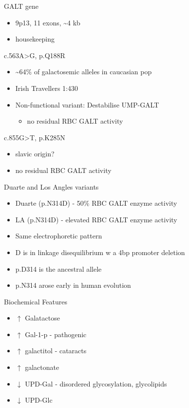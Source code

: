 \documentclass[presentation, smaller]{beamer}
\begin{document}
\begin{frame}[label={sec:orgb5fab23}]{GALT gene}
\begin{itemize}
\item 9p13, 11 exons, \textasciitilde{}4 kb
\item housekeeping
\end{itemize}
\begin{block}{c.563A>G, p.Q188R}
\begin{itemize}
\item \textasciitilde{}64\% of galactosemic alleles in caucasian pop
\item Irish Travellers 1:430
\item Non-functional variant: Destabilise UMP-GALT
\begin{itemize}
\item no residual RBC GALT activity
\end{itemize}
\end{itemize}
\end{block}

\begin{block}{c.855G>T, p.K285N}
\begin{itemize}
\item slavic origin?
\item no residual RBC GALT activity
\end{itemize}
\end{block}
\end{frame}

\begin{frame}[label={sec:org5c57b43}]{Duarte and Los Angles variants}
\begin{itemize}
\item Duarte (p.N314D) - 50\% RBC GALT enzyme activity
\item LA (p.N314D) - elevated RBC GALT enzyme activity
\item Same electrophoretic pattern
\item D is in linkage disequilibrium w a 4bp promoter deletion
\item p.D314 is the ancestral allele
\item p.N314 arose early in human evolution
\end{itemize}
\end{frame}


\begin{frame}[label={sec:orga6e2999}]{Biochemical Features}
\begin{itemize}
\item \(\uparrow\)  Galatactose
\item \(\uparrow\) Gal-1-p - pathogenic
\item \(\uparrow\)  galactitol - cataracts
\item \(\uparrow\) galactonate
\item \(\downarrow\) UPD-Gal - disordered glycosylation, glycolipids
\item \(\downarrow\) UPD-Glc
\end{itemize}
\end{frame}
\end{document}
